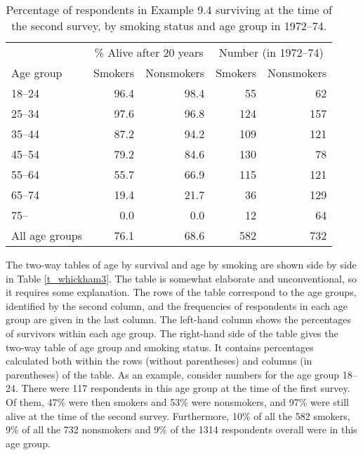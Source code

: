 \begin{table}[t]
\caption{Percentage of respondents in Example 9.4
surviving at the time of the second survey, by
smoking status and age group in 1972--74.}
\label{t_whickham2}
\begin{center}
\begin{tabular}{|l|rr|rr|}\hline
& \multicolumn{2}{|c|}{\% Alive after 20 years} &
 \multicolumn{2}{|c|}{Number (in 1972--74)} \\
Age group & Smokers & Nonsmokers & Smokers & Nonsmokers \\ \hline
18--24 & 96.4 & 98.4 & 55 & 62 \\
25--34 & 97.6 & 96.8 & 124 & 157 \\
35--44 & 87.2 & 94.2 & 109 & 121 \\
45--54 & 79.2 & 84.6 & 130 & 78 \\
55--64 & 55.7 & 66.9 & 115 & 121 \\
65--74 & 19.4 & 21.7 & 36 & 129 \\
75-- & 0.0 & 0.0 & 12 & 64 \\
\hline
All age groups & 76.1 & 68.6 & 582 & 732 \\ \hline
\end{tabular}
\end{center}

\end{table}

The two-way tables of age by survival and age by smoking are shown side
by side in Table \ref{t_whickham3}. The table is somewhat elaborate and
unconventional, so it requires some explanation. The rows of the table
correspond to the age groups, identified by the second column, and the
frequencies of respondents in each age group are given in the last
column. The left-hand column shows the percentages of survivors within
each age group. The right-hand side of the table gives the two-way table
of age group and smoking status. It contains percentages calculated both
within the rows (without parentheses) and columns (in parentheses) of
the table. As an example, consider numbers for the age group 18--24.
There were 117 respondents in this age group at the time of the first
survey. Of them, 47\% were then smokers and 53\% were nonsmokers, and
97\% were still alive at the time of the second survey. Furthermore,
10\% of all the 582 smokers, 9\% of all the 732 nonsmokers and 9\% of
the 1314 respondents overall were in this age group.

